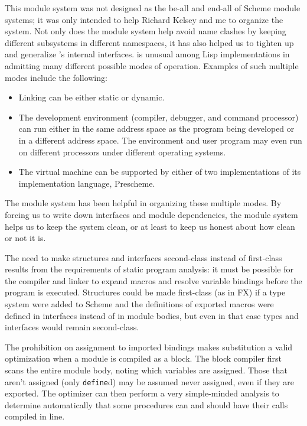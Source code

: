 This module system was not designed as the be-all and end-all of
Scheme module systems; it was only intended to help Richard Kelsey and
me to organize the \hack{} system.  Not only does the module system
help avoid name clashes by keeping different subsystems in different
namespaces, it has also helped us to tighten up and generalize
\hack{}'s internal interfaces.  \hack{} is unusual among Lisp
implementations in admitting many different possible modes of
operation.  Examples of such multiple modes include the following:
\begin{itemize}
    \item Linking can be either static or dynamic.

    \item The development environment (compiler, debugger, and command
    processor) can run either in the same address space as the program
    being developed or in a different address space.  The environment and
    user program may even run on different processors under different
    operating systems\cite{Rees-Donald:Program}.

    \item The virtual machine can be supported by either
    of two implementations of its implementation language, Prescheme.
\end{itemize}
The module system has been helpful in organizing these multiple modes.
By forcing us to write down interfaces and module dependencies, the
module system helps us to keep the system clean, or at least to keep
us honest about how clean or not it is.

The need to make structures and interfaces second-class instead of
first-class results from the requirements of static program analysis:
it must be possible for the compiler and linker to expand macros and
resolve variable bindings before the program is executed.  Structures
could be made first-class (as in FX\cite{Sheldon-Gifford:Static}) if a
type system were added to Scheme and the definitions of exported
macros were defined in interfaces instead of in module bodies, but
even in that case types and interfaces would remain second-class.

The prohibition on assignment to imported bindings makes substitution
a valid optimization when a module is compiled as a block.  The block
compiler first scans the entire module body, noting which variables
are assigned.  Those that aren't assigned (only {\tt define}d) may be
assumed never assigned, even if they are exported.  The optimizer can
then perform a very simple-minded analysis to determine automatically
that some procedures can and should have their calls compiled in line.

